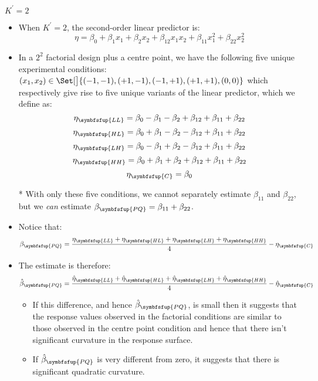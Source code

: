 \begin{Example}{$ K^\prime=2 $}{}
    \begin{itemize}
        \item When $ K^\prime=2 $, the second-order linear predictor is:
              \[ \eta=\beta_0+\beta_1x_1+\beta_2x_2+\beta_{12}x_1x_2+\beta_{11}x_1^2+\beta_{22}x_2^2 \]
        \item In a $ 2^2 $ factorial design plus a centre point, we have the following five unique experimental conditions:
              $ (x_1,x_2)\in\Set[\big]{(-1, -1), (+1, -1), (-1, +1), (+1, +1), (0, 0)} $ which respectively give rise to
              five unique variants of the linear predictor, which we define as:
              \[ \eta_{\symbfsfup{LL}}=\beta_0-\beta_1-\beta_2+\beta_{12}+\beta_{11}+\beta_{22} \]
              \[ \eta_{\symbfsfup{HL}}=\beta_0+\beta_1-\beta_2-\beta_{12}+\beta_{11}+\beta_{22} \]
              \[ \eta_{\symbfsfup{LH}}=\beta_0-\beta_1+\beta_2-\beta_{12}+\beta_{11}+\beta_{22} \]
              \[ \eta_{\symbfsfup{HH}}=\beta_0+\beta_1+\beta_2+\beta_{12}+\beta_{11}+\beta_{22} \]
              \[ \eta_{\symbfsfup{C}}=\beta_0 \]
        \item[*] With only these five conditions, we cannot separately estimate $ \beta_{11} $ and $ \beta_{22} $,
            but we \emph{can} estimate $ \beta_{\symbfsfup{PQ}}=\beta_{11}+\beta_{22} $.
        \item Notice that:
              \[ \beta_{\symbfsfup{PQ}}=\frac{\eta_{\symbfsfup{LL}}+\eta_{\symbfsfup{HL}}+\eta_{\symbfsfup{LH}}+\eta_{\symbfsfup{HH}}}{4}-\eta_{\symbfsfup{C}}  \]
        \item The estimate is therefore:
              \[ \hat{\beta}_{\symbfsfup{PQ}}=\frac{\hat{\eta}_{\symbfsfup{LL}}+\hat{\eta}_{\symbfsfup{HL}}+\hat{\eta}_{\symbfsfup{LH}}+\hat{\eta}_{\symbfsfup{HH}}}{4}-\hat{\eta}_{\symbfsfup{C}}  \]
              \begin{itemize}[*]
                  \item If this difference, and hence $ \hat{\beta}_{\symbfsfup{PQ}} $, is small then it suggests that the response values
                        observed in the factorial conditions are similar to those observed in the centre point condition and hence that there isn't
                        significant curvature in the response surface.
                  \item If $ \hat{\beta}_{\symbfsfup{PQ}} $ is very different from zero, it suggests that there is significant quadratic curvature.
              \end{itemize}

\end{itemize}
\end{Example}

